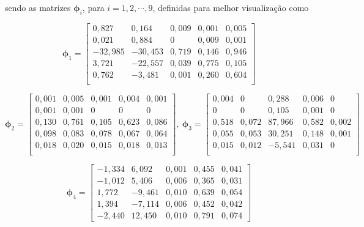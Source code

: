 \noindent sendo as matrizes $\boldsymbol{\phi}_{i}$, para $i=1,2,\cdots,9$, definidas para melhor visualização como

\[
\boldsymbol{\phi}_{1} = 
\begin{bmatrix}
    0,827   & 0,164     & 0,009     & 0,001     & 0,005 \\
    0,021   & 0,884     & 0         & 0,009     & 0,001 \\
   -32,985  & -30,453   & 0,719     & 0,146     & 0,946 \\
    3,721   & -22,557   & 0,039     & 0,775     & 0,105 \\
    0,762   & -3,481    & 0,001     & 0,260     & 0,604 \\
\end{bmatrix}
\]

\[
\boldsymbol{\phi}_{2} = 
\begin{bmatrix}
    0,001 & 0,005 & 0,001 & 0,004 & 0,001 \\
    0,001 & 0,001 & 0     & 0     & 0     \\
    0,130 & 0,761 & 0,105 & 0,623 & 0,086 \\
    0,098 & 0,083 & 0,078 & 0,067 & 0,064 \\
    0,018 & 0,020 & 0,015 & 0,018 & 0,013 \\
\end{bmatrix}, \ 
\boldsymbol{\phi}_{3} = 
\begin{bmatrix}
    0,004 & 0      &  0,288 & 0,006 & 0      \\
    0     & 0      &  0,105 & 0,001 & 0      \\
    0,518 & 0,072  & 87,966 & 0,582 & 0,002  \\
    0,055 &  0,053 & 30,251 & 0,148 & 0,001  \\
    0,015 &  0,012 & -5,541 &  0,031 &  0    \\
\end{bmatrix}
\]


\[
\boldsymbol{\phi}_{4} = 
\begin{bmatrix}
   -1,334 &  6,092 &  0,001 & 0,455 &  0,041 \\
   -1,012 &  5,406 & 0,006 & 0,365 &  0,031 \\
    1,772 & -9,461 &  0,010 &  0,639 & 0,054 \\
    1,394 & -7,114 &  0,006 &  0,452 & 0,042 \\
   -2,440 & 12,450 & 0,010 & 0,791 &  0,074
\end{bmatrix}
\]


